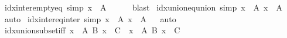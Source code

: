 \begin{isabellebody}
%
\isadelimproof
%
\endisadelimproof
\isanewline
\isanewline
{}\isamarkupfalse%
\ idx{\isacharunderscore}{\kern0pt}inter{\isacharunderscore}{\kern0pt}empty{\isacharunderscore}{\kern0pt}eq\ {\isacharbrackleft}{\kern0pt}simp{\isacharbrackright}{\kern0pt}{\isacharcolon}{\kern0pt}\ {\isachardoublequoteopen}{\isacharparenleft}{\kern0pt}{\isasymInter}x\ {\isasymin}\ A{\isachardot}{\kern0pt}\ {\isacharbraceleft}{\kern0pt}{\isacharbraceright}{\kern0pt}{\isacharparenright}{\kern0pt}\ {\isacharequal}{\kern0pt}\ {\isacharbraceleft}{\kern0pt}{\isacharbraceright}{\kern0pt}{\isachardoublequoteclose}%
\isadelimproof
\ %
\endisadelimproof
%
\isatagproof
{}\isamarkupfalse%
\ blast%
\endisatagproof
{\isafoldproof}%
%
\isadelimproof
%
\endisadelimproof
\isanewline
\isanewline
{}\isamarkupfalse%
\ idx{\isacharunderscore}{\kern0pt}union{\isacharunderscore}{\kern0pt}eq{\isacharunderscore}{\kern0pt}union\ {\isacharbrackleft}{\kern0pt}simp{\isacharbrackright}{\kern0pt}{\isacharcolon}{\kern0pt}\ {\isachardoublequoteopen}{\isacharparenleft}{\kern0pt}{\isasymUnion}x\ {\isasymin}\ A{\isachardot}{\kern0pt}\ x{\isacharparenright}{\kern0pt}\ {\isacharequal}{\kern0pt}\ {\isasymUnion}A{\isachardoublequoteclose}%
\isadelimproof
\ %
\endisadelimproof
%
\isatagproof
{}\isamarkupfalse%
\ auto%
\endisatagproof
{\isafoldproof}%
%
\isadelimproof
%
\endisadelimproof
\isanewline
\isanewline
{}\isamarkupfalse%
\ idx{\isacharunderscore}{\kern0pt}inter{\isacharunderscore}{\kern0pt}eq{\isacharunderscore}{\kern0pt}inter\ {\isacharbrackleft}{\kern0pt}simp{\isacharbrackright}{\kern0pt}{\isacharcolon}{\kern0pt}\ {\isachardoublequoteopen}{\isacharparenleft}{\kern0pt}{\isasymInter}x\ {\isasymin}\ A{\isachardot}{\kern0pt}\ x{\isacharparenright}{\kern0pt}\ {\isacharequal}{\kern0pt}\ {\isasymInter}A{\isachardoublequoteclose}%
\isadelimproof
\ %
\endisadelimproof
%
\isatagproof
{}\isamarkupfalse%
\ auto%
\endisatagproof
{\isafoldproof}%
%
\isadelimproof
%
\endisadelimproof
\isanewline
\isanewline
{}\isamarkupfalse%
\ idx{\isacharunderscore}{\kern0pt}union{\isacharunderscore}{\kern0pt}subset{\isacharunderscore}{\kern0pt}iff{\isacharcolon}{\kern0pt}\ {\isachardoublequoteopen}{\isacharparenleft}{\kern0pt}{\isasymUnion}x\ {\isasymin}\ A{\isachardot}{\kern0pt}\ B\ x{\isacharparenright}{\kern0pt}\ {\isasymsubseteq}\ C\ {\isasymlongleftrightarrow}\ {\isacharparenleft}{\kern0pt}{\isasymforall}x\ {\isasymin}\ A{\isachardot}{\kern0pt}\ B\ x\ {\isasymsubseteq}\ C{\isacharparenright}{\kern0pt}{\isachardoublequoteclose}%

\end{isabellebody}
